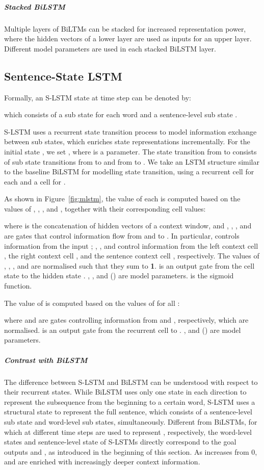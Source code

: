 \documentclass[11pt,a4paper]{article}
\begin{document}
\subparagraph{Stacked BiLSTM}
Multiple layers of BiLTMs can be stacked for increased representation power, where the hidden vectors of a lower layer are used as inputs for an upper layer. 
Different model parameters are used in each stacked BiLSTM layer.


\subsection{Sentence-State LSTM}
\label{sec:m-lstm}



Formally, an S-LSTM state at time step  can be denoted by:

which consists of a sub state  for each word  and a sentence-level sub state .


S-LSTM uses a recurrent state transition process to model information exchange between sub states, which enriches state representations incrementally.
For the initial state , we set , where  is a parameter. 
The state transition from  to  consists of sub state transitions from  to  and from  to .
We take an LSTM structure similar to the baseline BiLSTM for modelling state transition, using a recurrent cell  for each  and a cell  for .


As shown in Figure~\ref{fig:mlstm}, the value of each  is computed based on the values of , , ,  and , together with their corresponding cell values:

where  is the concatenation of hidden vectors of a context window, and , , ,  and  are gates that control information flow from  and  to .
In particular,  controls information from the input ; , ,  and  control information from the left context cell , the right context cell ,  and the sentence context cell , respectively.
The values of , , ,  and  are normalised such that they sum to {\bf 1}. 
 is an output gate from the cell state  to the hidden state .
, ,  and  () are model parameters.  is the sigmoid function.


The value of  is computed based on the values of  for all :

where  and  are gates controlling information from  and , respectively, which are normalised. 
 is an output gate from the recurrent cell  to .
,  and  () are model parameters.


\subparagraph{Contrast with BiLSTM}
The difference between S-LSTM and BiLSTM can be understood with respect to their recurrent states. 
While BiLSTM uses only one state in each direction to represent the subsequence from the beginning to a certain word, S-LSTM uses a structural state to represent the full sentence, which consists of a sentence-level sub state and  word-level sub states, simultaneously.
Different from BiLSTMs, for which  at different time steps are used to represent , respectively, the word-level states  and sentence-level state  of S-LSTMs directly correspond to the goal outputs  and , as introduced in the beginning of this section. 
As  increases from 0,  and  are enriched with increasingly deeper context information. 
\end{document}
